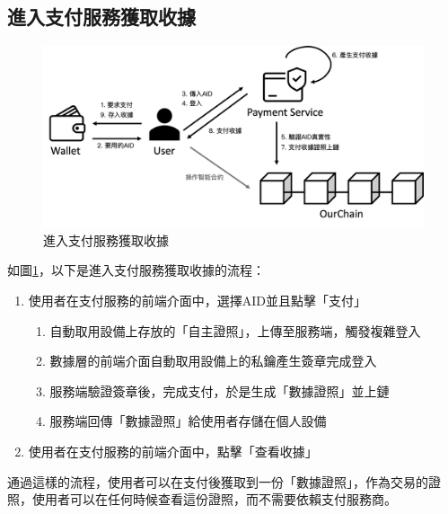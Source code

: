 \subsection{進入支付服務獲取收據}
\begin{figure}
  \centering
  \includegraphics[width=\linewidth, keepaspectratio]{figures/implement-2.png}
  \caption{進入支付服務獲取收據}
  \label{fig:implement-2}
\end{figure}
如圖\ref{fig:implement-2}，以下是進入支付服務獲取收據的流程：
\begin{enumerate}
  \item 使用者在支付服務的前端介面中，選擇AID並且點擊「支付」
        \begin{enumerate}
          \item 自動取用設備上存放的「自主證照」，上傳至服務端，觸發複雜登入
          \item 數據層的前端介面自動取用設備上的私鑰產生簽章完成登入
          \item 服務端驗證簽章後，完成支付，於是生成「數據證照」並上鏈
          \item 服務端回傳「數據證照」給使用者存儲在個人設備
        \end{enumerate}
  \item 使用者在支付服務的前端介面中，點擊「查看收據」
\end{enumerate}
通過這樣的流程，使用者可以在支付後獲取到一份「數據證照」，作為交易的證照，使用者可以在任何時候查看這份證照，而不需要依賴支付服務商。
